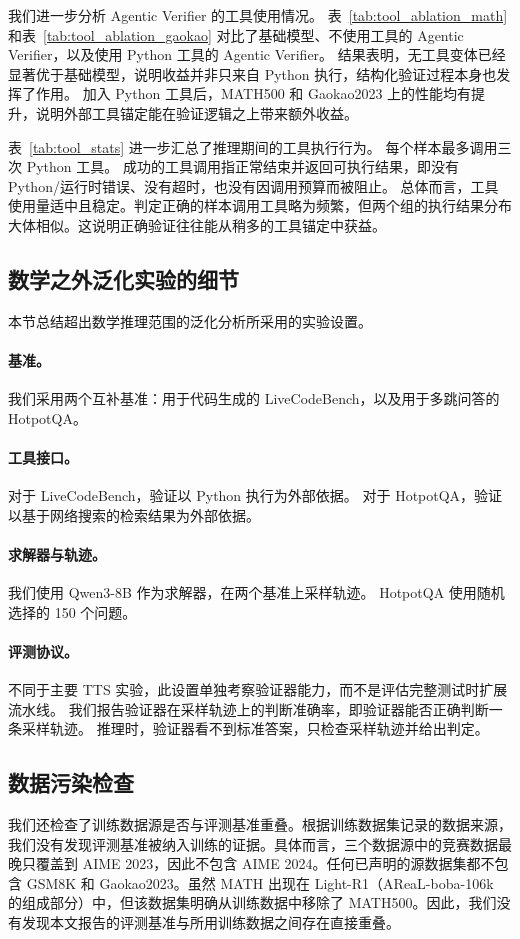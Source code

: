 \documentclass[11pt]{article}
\begin{document}
我们进一步分析 Agentic Verifier 的工具使用情况。
表~\ref{tab:tool_ablation_math} 和表~\ref{tab:tool_ablation_gaokao} 对比了基础模型、不使用工具的 Agentic Verifier，以及使用 Python 工具的 Agentic Verifier。
结果表明，无工具变体已经显著优于基础模型，说明收益并非只来自 Python 执行，结构化验证过程本身也发挥了作用。
加入 Python 工具后，MATH500 和 Gaokao2023 上的性能均有提升，说明外部工具锚定能在验证逻辑之上带来额外收益。

表~\ref{tab:tool_stats} 进一步汇总了推理期间的工具执行行为。
每个样本最多调用三次 Python 工具。
成功的工具调用指正常结束并返回可执行结果，即没有 Python/运行时错误、没有超时，也没有因调用预算而被阻止。
总体而言，工具使用量适中且稳定。判定正确的样本调用工具略为频繁，但两个组的执行结果分布大体相似。这说明正确验证往往能从稍多的工具锚定中获益。

\subsection{数学之外泛化实验的细节}
\label{sec:beyond_math}
本节总结超出数学推理范围的泛化分析所采用的实验设置。

\paragraph{基准。}
我们采用两个互补基准：用于代码生成的 LiveCodeBench，以及用于多跳问答的 HotpotQA。

\paragraph{工具接口。}
对于 LiveCodeBench，验证以 Python 执行为外部依据。
对于 HotpotQA，验证以基于网络搜索的检索结果为外部依据。

\paragraph{求解器与轨迹。}
我们使用 Qwen3-8B 作为求解器，在两个基准上采样轨迹。
HotpotQA 使用随机选择的 150 个问题。

\paragraph{评测协议。}
不同于主要 TTS 实验，此设置单独考察验证器能力，而不是评估完整测试时扩展流水线。
我们报告验证器在采样轨迹上的判断准确率，即验证器能否正确判断一条采样轨迹。
推理时，验证器看不到标准答案，只检查采样轨迹并给出判定。

\subsection{数据污染检查}
我们还检查了训练数据源是否与评测基准重叠。根据训练数据集记录的数据来源，我们没有发现评测基准被纳入训练的证据。具体而言，三个数据源中的竞赛数据最晚只覆盖到 AIME 2023，因此不包含 AIME 2024。任何已声明的源数据集都不包含 GSM8K 和 Gaokao2023。虽然 MATH 出现在 Light-R1（AReaL-boba-106k 的组成部分）中，但该数据集明确从训练数据中移除了 MATH500。因此，我们没有发现本文报告的评测基准与所用训练数据之间存在直接重叠。
\end{document}
